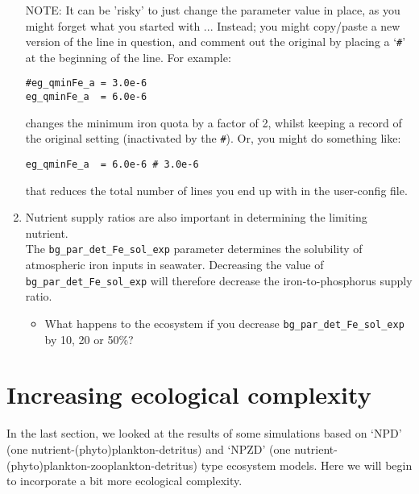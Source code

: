 \documentclass[11pt,fleqn]{book} %
\begin{document}
\begin{enumerate}[noitemsep]
\vspace{1mm}
\item[NOTE:] It can be 'risky' to just change the parameter value in place, as you might forget what you started with ... Instead; you might copy/paste a new version of the line in question, and comment out the original by placing a `\texttt{\#}' at the beginning of the line. For example:
\vspace{-1mm}\small\begin{verbatim}
#eg_qminFe_a = 3.0e-6
eg_qminFe_a  = 6.0e-6
\end{verbatim}\normalsize\vspace{-1mm}
changes the minimum iron quota by a factor of 2, whilst keeping a record of the original setting (inactivated by the \texttt{\#}). Or, you might do something like:
\vspace{-1mm}\small\begin{verbatim}
eg_qminFe_a  = 6.0e-6 # 3.0e-6
\end{verbatim}\normalsize\vspace{-1mm}
that reduces the total number of lines you end up with in the user-config file.

\vspace{1mm}
\item Nutrient supply ratios are also important in determining the limiting nutrient.
\\The \texttt{bg\_par\_det\_Fe\_sol\_exp} parameter determines the solubility of atmospheric iron inputs in seawater. Decreasing the value of \texttt{bg\_par\_det\_Fe\_sol\_exp} will therefore decrease the iron-to-phosphorus supply ratio.
\begin{itemize}
\item What happens to the ecosystem if you decrease \texttt{bg\_par\_det\_Fe\_sol\_exp} by 10, 20 or 50\%?
\end{itemize}

\end{enumerate}
\vspace{2mm}


\newpage


\section{Increasing ecological complexity}

In the last section, we looked at the results of some simulations based on `NPD' (one nutrient-(phyto)plankton-detritus) and `NPZD' (one nutrient-(phyto)plankton-zooplankton-detritus) type ecosystem models. Here we will begin to incorporate a bit more ecological complexity.  
\end{document}
